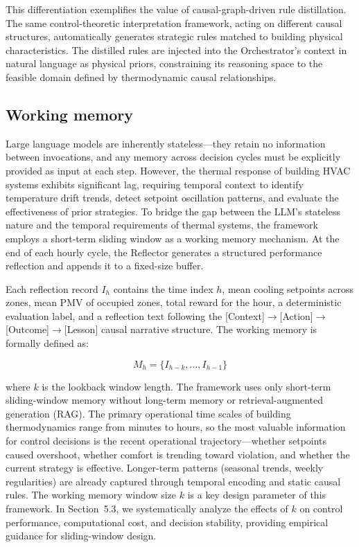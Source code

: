 \documentclass[a4paper]{cas-sc}
\begin{document}
This differentiation exemplifies the value of causal-graph-driven rule distillation. The same control-theoretic interpretation framework, acting on different causal structures, automatically generates strategic rules matched to building physical characteristics. The distilled rules are injected into the Orchestrator's context in natural language as physical priors, constraining its reasoning space to the feasible domain defined by thermodynamic causal relationships.

\subsection{Working memory}
\label{sec:working_memory}

Large language models are inherently stateless---they retain no information between invocations, and any memory across decision cycles must be explicitly provided as input at each step. However, the thermal response of building HVAC systems exhibits significant lag, requiring temporal context to identify temperature drift trends, detect setpoint oscillation patterns, and evaluate the effectiveness of prior strategies. To bridge the gap between the LLM's stateless nature and the temporal requirements of thermal systems, the framework employs a short-term sliding window as a working memory mechanism. At the end of each hourly cycle, the Reflector generates a structured performance reflection and appends it to a fixed-size buffer.

Each reflection record $I_h$ contains the time index $h$, mean cooling setpoints across zones, mean PMV of occupied zones, total reward for the hour, a deterministic evaluation label, and a reflection text following the [Context]$\rightarrow$[Action]$\rightarrow$[Outcome]$\rightarrow$[Lesson] causal narrative structure. The working memory is formally defined as:

\begin{equation}
M_h = \{I_{h-k}, \ldots, I_{h-1}\}
\label{eq:memory}
\end{equation}

\noindent where $k$ is the lookback window length. The framework uses only short-term sliding-window memory without long-term memory or retrieval-augmented generation (RAG). The primary operational time scales of building thermodynamics range from minutes to hours, so the most valuable information for control decisions is the recent operational trajectory---whether setpoints caused overshoot, whether comfort is trending toward violation, and whether the current strategy is effective. Longer-term patterns (seasonal trends, weekly regularities) are already captured through temporal encoding and static causal rules. The working memory window size $k$ is a key design parameter of this framework. In Section~5.3, we systematically analyze the effects of $k$ on control performance, computational cost, and decision stability, providing empirical guidance for sliding-window design.
\end{document}
